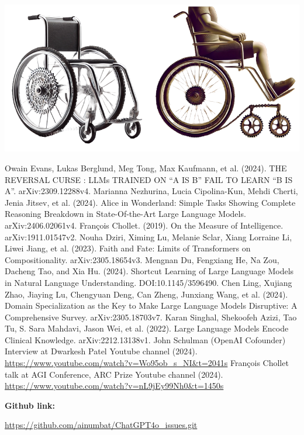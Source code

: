 \documentclass[11pt]{scrartcl}
\begin{document}
\vspace{1cm}

\includegraphics[width=0.99\linewidth, center]{conclusion_image.png}

\vspace{1cm}

\begin{thebibliography}{9}  %

	Owain Evans, Lukas Berglund, Meg Tong, Max Kaufmann, et al. (2024). THE REVERSAL CURSE : LLMs TRAINED ON “A IS B” FAIL TO LEARN “B IS A”. arXiv:2309.12288v4.      
    Marianna Nezhurina, Lucia Cipolina-Kun, Mehdi Cherti, Jenia Jitsev, et al. (2024). Alice in Wonderland: Simple Tasks Showing Complete Reasoning Breakdown in State-Of-the-Art Large Language Models. arXiv:2406.02061v4.
    François Chollet. (2019). On the Measure of Intelligence. arXiv:1911.01547v2.
    Nouha Dziri, Ximing Lu, Melanie Sclar, Xiang Lorraine Li, Liwei Jiang, et al. (2023). Faith and Fate: Limits of Transformers on Compositionality. arXiv:2305.18654v3.
    Mengnan Du, Fengxiang He, Na Zou, Dacheng Tao, and Xia Hu. (2024). Shortcut Learning of Large Language Models in Natural Language Understanding. DOI:10.1145/3596490.
    Chen Ling, Xujiang Zhao, Jiaying Lu, Chengyuan Deng, Can Zheng, Junxiang Wang, et al. (2024). Domain Specialization as the Key to Make Large Language Models Disruptive: A Comprehensive Survey. arXiv:2305.18703v7.
	Karan Singhal, Shekoofeh Azizi, Tao Tu, S. Sara Mahdavi, Jason Wei, et al. (2022). Large Language Models Encode Clinical Knowledge. arXiv:2212.13138v1.
	John Schulman (OpenAI Cofounder) Interview at Dwarkesh Patel Youtube channel (2024). \url{https://www.youtube.com/watch?v=Wo95ob_s_NI&t=2041s}
	François Chollet talk at AGI Conference, ARC Prize Youtube channel (2024). \url{https://www.youtube.com/watch?v=nL9jEy99Nh0&t=1450s}
    
\end{thebibliography}

\vspace{1cm}

\begin{large}
\textbf{Github link:} 
\end{large}
\url{https://github.com/ainumbat/ChatGPT4o_issues.git}
\end{document}
